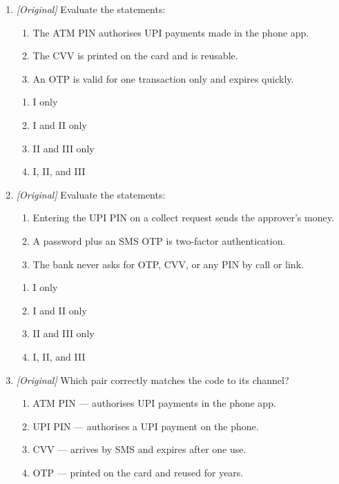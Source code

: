 \begin{enumerate}[label=\textbf{Q\arabic*.}, leftmargin=*]
\begin{enumerate}[label=\Alph*.]
    \item The preferred language for customer service.
  \end{enumerate}
\item \textit{[Original]} Evaluate the statements:
  \begin{enumerate}[label=\Roman*.]
    \item The ATM PIN authorises UPI payments made in the phone app.
    \item The CVV is printed on the card and is reusable.
    \item An OTP is valid for one transaction only and expires quickly.
  \end{enumerate}
  \begin{enumerate}[label=\Alph*.]
    \item I only
    \item I and II only
    \item II and III only
    \item I, II, and III
  \end{enumerate}
\item \textit{[Original]} Evaluate the statements:
  \begin{enumerate}[label=\Roman*.]
    \item Entering the UPI PIN on a collect request sends the approver's
      money.
    \item A password plus an SMS OTP is two-factor authentication.
    \item The bank never asks for OTP, CVV, or any PIN by call or link.
  \end{enumerate}
  \begin{enumerate}[label=\Alph*.]
    \item I only
    \item I and II only
    \item II and III only
    \item I, II, and III
  \end{enumerate}
\item \textit{[Original]} Which pair correctly matches the code to its
  channel?
  \begin{enumerate}[label=\Alph*.]
    \item ATM PIN --- authorises UPI payments in the phone app.
    \item UPI PIN --- authorises a UPI payment on the phone.
    \item CVV --- arrives by SMS and expires after one use.
    \item OTP --- printed on the card and reused for years.

\end{enumerate}
\end{enumerate}

